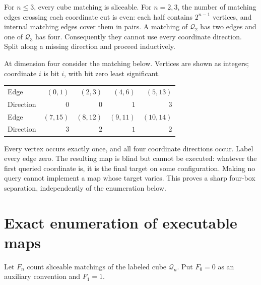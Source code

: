 \documentclass[11pt,letterpaper]{article}
\theoremstyle{definition}
\begin{document}
For $n\le3$, every cube matching is sliceable. For $n=2,3$, the number of matching edges crossing each coordinate cut is even: each half contains $2^{n-1}$ vertices, and internal matching edges cover them in pairs. A matching of $\mathcal Q_2$ has two edges and one of $\mathcal Q_3$ has four. Consequently they cannot use every coordinate direction. Split along a missing direction and proceed inductively.

At dimension four consider the matching below. Vertices are shown as integers; coordinate $i$ is bit $i$, with bit zero least significant.
\begin{center}
\begin{tabular}{lrrrr}
\toprule
Edge & $(0,1)$ & $(2,3)$ & $(4,6)$ & $(5,13)$ \\
Direction & $0$ & $0$ & $1$ & $3$ \\
\midrule
Edge & $(7,15)$ & $(8,12)$ & $(9,11)$ & $(10,14)$ \\
Direction & $3$ & $2$ & $1$ & $2$ \\
\bottomrule
\end{tabular}
\end{center}
Every vertex occurs exactly once, and all four coordinate directions occur. Label every edge zero. The resulting map is blind but cannot be executed: whatever the first queried coordinate is, it is the final target on some configuration. Making no query cannot implement a map whose target varies. This proves a sharp four-box separation, independently of the enumeration below.

\section{Exact enumeration of executable maps}
\label{mbg:sec:enumeration}

Let $F_n$ count sliceable matchings of the labeled cube $\mathcal Q_n$. Put $F_0=0$ as an auxiliary convention and $F_1=1$.
\end{document}
